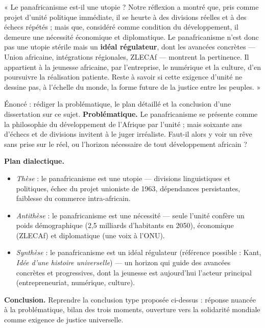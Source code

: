 \documentclass[11pt]{article}
\begin{document}
\begin{exemplebox}
« Le panafricanisme est-il une utopie ? Notre réflexion a montré que, pris comme projet d'unité politique immédiate, il se heurte à des divisions réelles et à des échecs répétés ; mais que, considéré comme condition du développement, il demeure une nécessité économique et diplomatique. Le panafricanisme n'est donc pas une utopie stérile mais un \textbf{idéal régulateur}, dont les avancées concrètes — Union africaine, intégrations régionales, ZLECAf — montrent la pertinence. Il appartient à la jeunesse africaine, par l'entreprise, le numérique et la culture, d'en poursuivre la réalisation patiente. Reste à savoir si cette exigence d'unité ne dessine pas, à l'échelle du monde, la forme future de la justice entre les peuples. »
\end{exemplebox}

\begin{exoresolu}
Énoncé : rédiger la problématique, le plan détaillé et la conclusion d'une dissertation sur ce sujet.
\tcblower
\textbf{Problématique.} Le panafricanisme se présente comme la philosophie du développement de l'Afrique par l'unité ; mais soixante ans d'échecs et de divisions invitent à le juger irréaliste. Faut-il alors y voir un rêve sans prise sur le réel, ou l'horizon nécessaire de tout développement africain ?

\textbf{Plan dialectique.}
\begin{itemize}
\item \emph{Thèse} : le panafricanisme est une utopie — divisions linguistiques et politiques, échec du projet unioniste de 1963, dépendances persistantes, faiblesse du commerce intra-africain.
\item \emph{Antithèse} : le panafricanisme est une nécessité — seule l'unité confère un poids démographique (2,5 milliards d'habitants en 2050), économique (ZLECAf) et diplomatique (une voix à l'ONU).
\item \emph{Synthèse} : le panafricanisme est un idéal régulateur (référence possible : Kant, \emph{Idée d'une histoire universelle}) — un horizon qui guide des avancées concrètes et progressives, dont la jeunesse est aujourd'hui l'acteur principal (entrepreneuriat, numérique, culture).
\end{itemize}

\textbf{Conclusion.} Reprendre la conclusion type proposée ci-dessus : réponse nuancée à la problématique, bilan des trois moments, ouverture vers la solidarité mondiale comme exigence de justice universelle.
\end{exoresolu}
\end{document}
